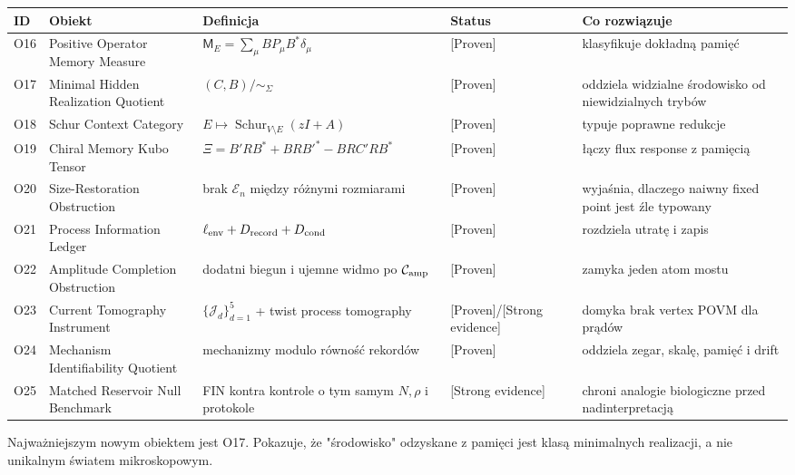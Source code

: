 \documentclass[11pt,a4paper,openany]{report}
\newcommand{\statusProven}{\textcolor{fingreen}{[Proven]}}
\newcommand{\statusStrong}{\textcolor{finblue}{[Strong evidence]}}
\begin{document}
\begin{center}
\begingroup\fontsize{7}{8.4}\selectfont
\setlength{\tabcolsep}{2.5pt}
\renewcommand{\arraystretch}{1.16}
\begin{longtable}{@{}p{}p{}p{}p{}p{}@{}}
\toprule
\textbf{ID} & \textbf{Obiekt} & \textbf{Definicja} & \textbf{Status} & \textbf{Co rozwiązuje} \\
\midrule
\endhead
O16 & Positive Operator Memory Measure & \(\mathsf M_E=\sum_\mu BP_\mu B^\ast\delta_\mu\) & \statusProven{} & klasyfikuje dokładną pamięć \\
O17 & Minimal Hidden Realization Quotient & \((C,B)/{\sim_\Sigma}\) & \statusProven{} & oddziela widzialne środowisko od niewidzialnych trybów \\
O18 & Schur Context Category & \(E\mapsto\operatorname{Schur}_{V\setminus E}(zI+A)\) & \statusProven{} & typuje poprawne redukcje \\
O19 & Chiral Memory Kubo Tensor & \(\Xi=B'RB^\ast+BRB'^\ast-BRC'RB^\ast\) & \statusProven{} & łączy flux response z pamięcią \\
O20 & Size-Restoration Obstruction & brak \(\mathcal E_n\) między ró\.znymi rozmiarami & \statusProven{} & wyjaśnia, dlaczego naiwny fixed point jest źle typowany \\
O21 & Process Information Ledger & \(\ell_{\rm env}+D_{\rm record}+D_{\rm cond}\) & \statusProven{} & rozdziela utratę i zapis \\
O22 & Amplitude Completion Obstruction & dodatni biegun i ujemne widmo po \(\mathcal C_{\rm amp}\) & \statusProven{} & zamyka jeden atom mostu \\
O23 & Current Tomography Instrument & \(\{\mathcal J_d\}_{d=1}^5\) + twist process tomography & \statusProven{}/\allowbreak{}\statusStrong{} & domyka brak vertex POVM dla prądów \\
O24 & Mechanism Identifiability Quotient & mechanizmy modulo równość rekordów & \statusProven{} & oddziela zegar, skalę, pamięć i drift \\
O25 & Matched Reservoir Null Benchmark & FIN kontra kontrole o tym samym \(N,\rho\) i protokole & \statusStrong{} & chroni analogie biologiczne przed nadinterpretacją \\
\bottomrule
\end{longtable}
\endgroup
\end{center}

Najwa\.zniejszym nowym obiektem jest O17. Pokazuje, \.ze "środowisko" odzyskane z pamięci jest klasą minimalnych realizacji, a nie unikalnym światem mikroskopowym.
\end{document}
